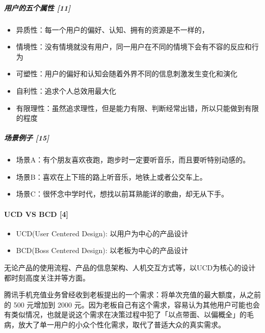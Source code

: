 \documentclass[letterpaper,11pt,english]{sphinxmanual}
\begin{document}
\subparagraph{用户的五个属性 {[}11{]}}
\label{\detokenize{chapter_knowledge/users_analysis:id4}}\begin{itemize}
\item {} 
异质性：每一个用户的偏好、认知、拥有的资源是不一样的，

\item {} 
情境性：没有情境就没有用户，同一用户在不同的情境下会有不容的反应和行为

\item {} 
可塑性：用户的偏好和认知会随着外界不同的信息刺激发生变化和演化

\item {} 
自利性：追求个人总效用最大化

\item {} 
有限理性：虽然追求理性，但是能力有限、判断经常出错，所以只能做到有限的程度

\end{itemize}


\subparagraph{场景例子 {[}15{]}}
\label{\detokenize{chapter_knowledge/users_analysis:id5}}\begin{itemize}
\item {} 
场景A：有个朋友喜欢夜跑，跑步时一定要听音乐，而且要听特别动感的。

\item {} 
场景B：喜欢在上下班的路上听音乐，地铁上或者公交车上。

\item {} 
场景C：很怀念中学时代，想找以前耳熟能详的歌曲，却无从下手。

\end{itemize}


\paragraph{UCD VS BCD {[}4{]}}
\label{\detokenize{chapter_knowledge/users_analysis:ucd-vs-bcd-4}}\begin{itemize}
\item {} 
UCD(User Centered Design): 以用户为中心的产品设计

\item {} 
BCD(Boss Centered Design): 以老板为中心的产品设计

\end{itemize}

无论产品的使用流程、产品的信息架构、人机交互方式等，以UCD为核心的设计都时刻高度关注并等方面。

腾讯手机充值业务曾经收到老板提出的一个需求：将单次充值的最大额度，从之前的
500 元增加到 2000
元。因为老板自己有这个需求，容易认为其他用户可能也会有类似情况，也就是说这个需求在决策过程中犯了「以点带面、以偏概全」的毛病，放大了单一用户的小众个性化需求，取代了普适大众的真实需求。
\end{document}
